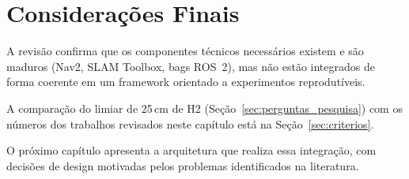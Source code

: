 \section{Considerações Finais}
\label{sec:rel_conclusao}

A revisão confirma que os componentes técnicos necessários existem e são maduros
(Nav2, SLAM Toolbox, bags ROS~2), mas não estão integrados de forma coerente
em um framework orientado a experimentos reprodutíveis.

A comparação do limiar de 25\,cm de H2 (Seção~\ref{sec:perguntas_pesquisa}) com
os números dos trabalhos revisados neste capítulo está na
Seção~\ref{sec:criterios}.

O próximo capítulo apresenta a arquitetura que realiza essa integração, com
decisões de design motivadas pelos problemas identificados na literatura.
